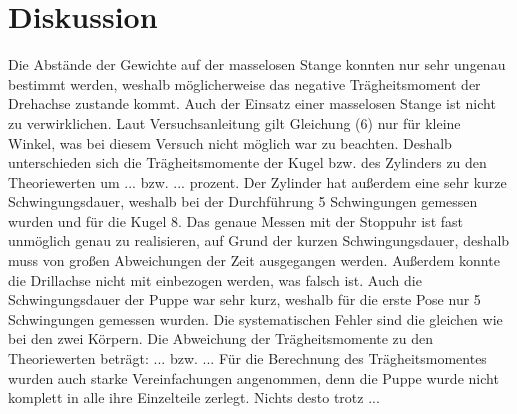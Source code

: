 \section{Diskussion}
\label{sec:Diskussion}

Die Abstände der Gewichte auf der masselosen Stange konnten nur
sehr ungenau bestimmt werden, weshalb möglicherweise das negative Trägheitsmoment
der Drehachse zustande kommt. Auch der Einsatz einer masselosen Stange ist nicht
zu verwirklichen. 
Laut Versuchsanleitung gilt Gleichung (6) nur für kleine Winkel, was 
bei diesem Versuch nicht möglich war zu beachten. Deshalb unterschieden sich
die Trägheitsmomente der Kugel bzw. des Zylinders zu den Theoriewerten um
... bzw. ... prozent. Der Zylinder hat außerdem eine sehr kurze Schwingungsdauer,
weshalb bei der Durchführung 5 Schwingungen gemessen wurden und für die Kugel 8.
Das genaue Messen mit der Stoppuhr ist fast unmöglich genau zu realisieren, auf Grund der 
kurzen Schwingungsdauer, deshalb muss von großen Abweichungen der Zeit ausgegangen werden.
Außerdem konnte die Drillachse nicht mit einbezogen werden, was falsch ist.
Auch die Schwingungsdauer der Puppe war sehr kurz, weshalb für die erste Pose nur 5 Schwingungen gemessen wurden.
Die systematischen Fehler sind die gleichen wie bei den zwei Körpern.
Die Abweichung der Trägheitsmomente zu den Theoriewerten beträgt: ... bzw. ...
Für die Berechnung des Trägheitsmomentes wurden auch starke Vereinfachungen angenommen,
denn die Puppe wurde nicht komplett in alle ihre Einzelteile zerlegt. Nichts desto trotz ...
